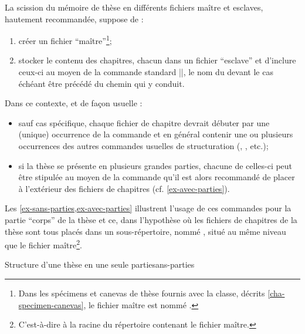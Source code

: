La scission du mémoire de thèse en différents fichiers maître et esclaves,
hautement recommandée, suppose de :
\begin{enumerate}
\item créer un fichier \enquote{maître}\footnote{Dans les spécimens et canevas
    de thèse fournis avec la classe, décrits \vref{cha-specimen-canevas}, le
    fichier maître est nommé .};
\item stocker le contenu des chapitres, chacun dans un fichier
  \enquote{esclave}
  et d'inclure ceux-ci au moyen de la commande
  standard ||, le nom du  devant le cas échéant être précédé du chemin qui y
  conduit.
\end{enumerate}
%
Dans ce contexte, et de façon usuelle :
\begin{itemize}
\item sauf cas spécifique, chaque fichier de chapitre devrait débuter par une
  (unique) occurrence de la commande  et en général
  contenir une ou plusieurs occurrences des autres commandes usuelles de
  structuration (, , etc.);
\item si la thèse se présente en plusieurs grandes parties, chacune
  de celles-ci peut être stipulée au moyen de la commande
   qu'il est alors recommandé de placer à
  l'extérieur des fichiers de chapitres (cf.
  \vref{ex-avec-parties}).
\end{itemize}
%
Les \vref{ex-sans-parties,ex-avec-parties} illustrent l'usage de
ces commandes pour la partie \enquote{corps} de la thèse et ce, dans l'hypothèse
où les fichiers de chapitres de la thèse sont tous placés dans un
sous-répertoire, nommé , situé au même niveau que le fichier
maître\footnote{C'est-à-dire à la racine du répertoire contenant le fichier
  maître.}.
\begin{dbexample}{Structure d'une thèse en une seule partie}{sans-parties}
\begin{bodycode}
"}
"}
...
"}
"}
\end{bodycode}
\end{dbexample}
